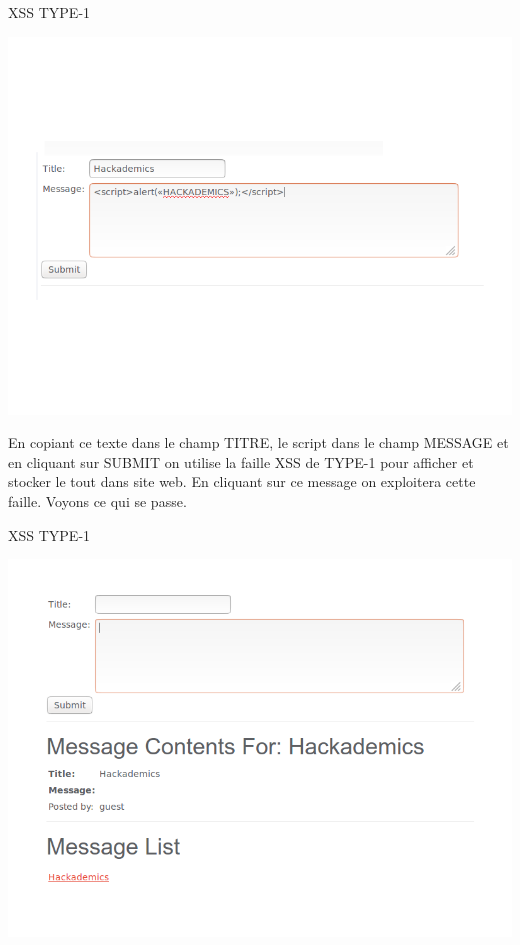 \begin{itemize}
\begin{center}
\caption{XSS TYPE-1}
\includegraphics[scale=0.3]{Web/assets/xsst1-0.png}
\end{center}


\begin{flushleft}
En copiant ce texte dans le champ TITRE, le script dans le champ MESSAGE et  en cliquant sur SUBMIT on utilise la faille XSS de TYPE-1 pour afficher et stocker le tout dans site web. En cliquant sur ce message on exploitera cette faille. Voyons ce qui se passe.
\end{flushleft}


\begin{center}
\caption{XSS TYPE-1}
\includegraphics[scale=0.3]{Web/assets/xsst1-1.png}
\end{center}


\end{itemize}

